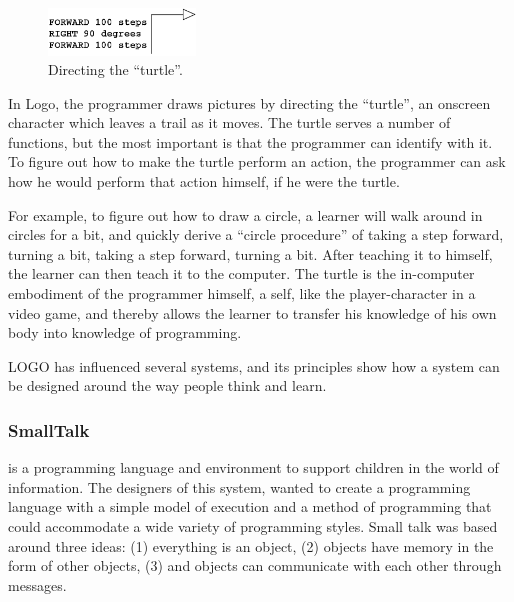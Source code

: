 \begin{figure}
  \vspace{-25pt}
  \begin{center}
    \includegraphics[width=0.35\textwidth]{img/turtle}
  \end{center}
  \vspace{-20pt}
 \caption{Directing the ``turtle''.}  
  \vspace{-20pt}
    \label{fig:turtle}
\end{figure}

In Logo, the programmer draws pictures by directing the ``turtle'', an onscreen character which leaves a trail as it moves. The turtle serves a number of functions, but the most important is that the programmer can identify with it. To figure out how to make the turtle perform an action, the programmer can ask how he would perform that action himself, if he were the turtle.

For example, to figure out how to draw a circle, a learner will walk around in circles for a bit, and quickly derive a ``circle procedure'' of taking a step forward, turning a bit, taking a step forward, turning a bit. After teaching it to himself, the learner can then teach it to the computer. The turtle is the in-computer embodiment of the programmer himself, a self, like the player-character in a video game, and thereby allows the learner to 
transfer his knowledge of his own body into knowledge of programming.

LOGO has influenced several systems, and its principles show how a system can be designed around the way people think and learn.
\subsubsection{SmallTalk~\cite{Kay1993}} is a programming language and environment to support children in the world of information. The designers of this system, wanted to create a programming language with a simple model of execution and a method of programming that could accommodate a wide variety of programming styles. Small talk was based around three ideas: (1) everything is an object, (2) objects have memory in the form of other objects, (3) and objects can communicate with each other through messages.

